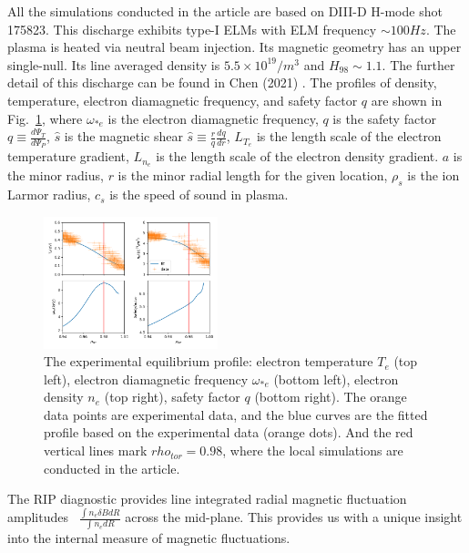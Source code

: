 \documentclass[
 aip,
 amsmath,amssymb,
 reprint
]{revtex4-1}
\begin{document}
All the simulations conducted in the article are based on DIII-D H-mode shot 175823. This discharge exhibits type-I ELMs with ELM frequency $\sim 100 Hz$. The plasma is heated via neutral beam injection. Its magnetic geometry has an upper single-null. Its line averaged density is $5.5\times10^{19}/m^3$ and $H_{98}\sim 1.1$. The further detail of this discharge can be found in Chen (2021) \cite{RIP_Chen_POP_2021}. 
The profiles of density, temperature, electron diamagnetic frequency, and safety factor $q$ are shown in Fig.~\ref{fig:EFIT}, where $\omega_{*e}$ is the electron diamagnetic frequency, $q$ is the safety factor $q\equiv\frac{d\Psi_{T}}{d\Psi_{P}}$, $\hat{s}$ is the magnetic shear $\hat{s}\equiv \frac{r}{q}\frac{dq}{dr}$, $L_{T_e}$ is the length scale of the electron temperature gradient, $L_{n_e}$ is the length scale of the electron density gradient. $a$ is the minor radius, $r$ is the minor radial length for the given location, $\rho_s$ is the ion Larmor radius, $c_s$ is the speed of sound in plasma. 



\begin{figure}[h]
\centering
        \includegraphics[width=0.45\textwidth]{2.png}
        \caption[font=5]{The experimental equilibrium profile: electron temperature $T_e$ (top left), electron diamagnetic frequency $\omega_{*e}$ (bottom left), electron density $n_e$ (top right), safety factor $q$ (bottom right). The orange data points are experimental data, and the blue curves are the fitted profile based on the experimental data (orange dots). And the red vertical lines mark $rho_{tor}=0.98$, where the local simulations are conducted in the article. }
        \label{fig:EFIT}
\end{figure}

The RIP diagnostic provides line integrated radial magnetic fluctuation amplitudes~\cite{rip} $\frac{\int n_e \delta B dR}{\int n_e dR}$ across the mid-plane.  This provides us with a unique insight into the internal measure of magnetic fluctuations. %
\end{document}

